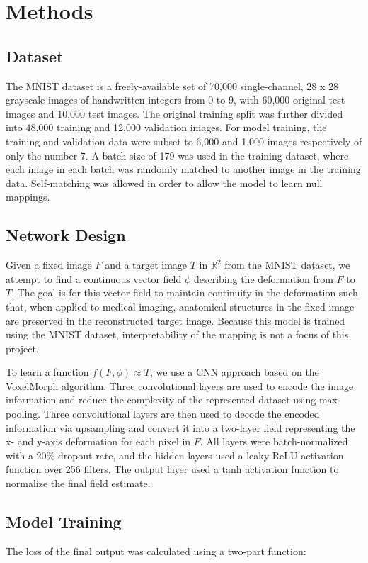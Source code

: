 \documentclass{article} %
\begin{document}
\section{Methods}

\subsection{Dataset}
The MNIST dataset is a freely-available set of 70,000 single-channel, 28 x 28 grayscale images of handwritten integers from 0 to 9, with 60,000 original test images and 10,000 test images. The original training split was further divided into 48,000 training and 12,000 validation images. For model training, the training and validation data were subset to 6,000 and 1,000 images respectively of only the number 7.  A batch size of 179 was used in the training dataset, where each image in each batch was randomly matched to another image in the training data. Self-matching was allowed in order to allow the model to learn null mappings. 

\subsection{Network Design}
Given a fixed image $F$ and a target image $T$ in $\mathbb{R}^2$ from the MNIST dataset, we attempt to find a continuous vector field $\phi$ describing the deformation from $F$ to $T$. The goal is for this vector field to maintain continuity in the deformation such that, when applied to medical imaging, anatomical structures in the fixed image are preserved in the reconstructed target image. Because this model is trained using the MNIST dataset, interpretability of the mapping is not a focus of this project. 

To learn a function $f(F, \phi) \approx T$, we use a CNN approach based on the VoxelMorph algorithm. Three convolutional layers are used to encode the image information and reduce the complexity of the represented dataset using max pooling. Three convolutional layers are then used to decode the encoded information via upsampling and convert it into a two-layer field representing the x- and y-axis deformation for each pixel in $F$. All layers were batch-normalized with a 20\% dropout rate, and the hidden layers used a leaky ReLU activation function over 256 filters. The output layer used a tanh activation function to normalize the final field estimate. 

\subsection{Model Training}
The loss of the final output was calculated using a two-part function:
\end{document}
